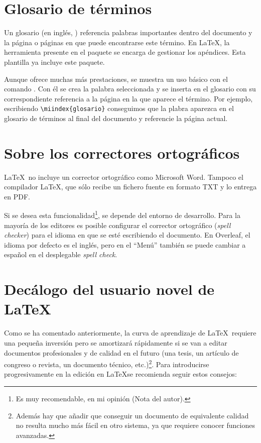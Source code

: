 \section{Glosario de términos}
Un glosario (en inglés, ) referencia palabras importantes dentro del documento y la página o páginas en que puede encontrarse este término. En \LaTeX, la herramienta  presente en el paquete  se encarga de gestionar los apéndices. Esta plantilla ya incluye este paquete.

Aunque  ofrece muchas más prestaciones, se muestra un uso básico con el comando . Con él se crea la palabra seleccionada y se inserta en el glosario con su correspondiente referencia a la página en la que aparece el término. Por ejemplo, escribiendo \verb|\miindex{glosario}| conseguimos que la plabra  aparezca en el glosario de términos al final del documento y referencie la página actual.

\section{Sobre los correctores ortográficos}

\LaTeX\ no incluye un corrector ortográfico como Microsoft Word\R.
Tampoco el compilador \LaTeX, que sólo recibe un fichero fuente en formato TXT y lo entrega en PDF.

Si se desea esta funcionalidad\footnote{Es muy recomendable, en mi opinión (Nota del autor).}, se depende del entorno de desarrollo. Para la mayoría de los editores es posible configurar el corrector ortográfico (\emph{spell checker}) para el idioma en que se esté escribiendo el documento. En Overleaf, el idioma por defecto es el inglés, pero en el ``Menú'' también se puede cambiar a español en el desplegable \emph{spell check}.

\section{Decálogo del usuario novel de \LaTeX}

Como se ha comentado anteriormente, la curva de aprendizaje de \LaTeX\ requiere una pequeña inversión pero se amortizará rápidamente si se van a editar documentos profesionales y de calidad en el futuro (una tesis, un artículo de congreso o revista, un documento técnico, etc.)\footnote{Además hay que añadir que conseguir un documento de equivalente calidad no resulta mucho más fácil en otro sistema, ya que requiere conocer funciones avanzadas.}. Para introducirse progresivamente en la edición en \LaTeX se recomienda seguir estos consejos:

